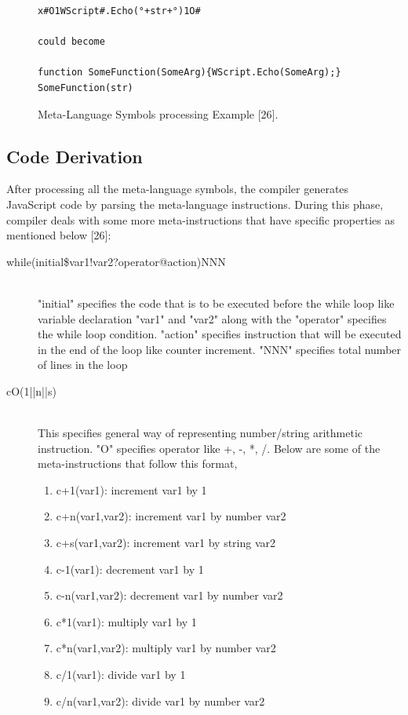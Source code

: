 \begin{figure}
  \centering
  \begin{lstlisting}[language=myasm,numbers=none]
x#O1WScript#.Echo(°+str+°)1O# 

could become

function SomeFunction(SomeArg){WScript.Echo(SomeArg);}
SomeFunction(str)
\end{lstlisting}
    \caption[Meta-Language Symbols processing Example]{Meta-Language Symbols processing Example [26].}
    \label{fig:metalanguageprocessing}
\end{figure}

\subsection{Code Derivation}
After processing all the meta-language symbols, the compiler generates JavaScript code by parsing the meta-language instructions. During this phase, compiler deals with some more meta-instructions that have specific properties as mentioned below [26]:

\begin{description}

\item[while(initial\$var1!var2?operator@action)NNN] \hfill \\
"initial" specifies the code that is to be executed before the while loop like variable declaration
"var1" and "var2" along with the "operator" specifies the while loop condition.
"action" specifies instruction that will be executed in the end of the loop like counter increment.
"NNN" specifies total number of lines in the loop
\item[cO(1||n||s)] \hfill \\
This specifies general way of representing number/string arithmetic instruction. "O" specifies operator like +, -, *, /. Below are some of the meta-instructions that follow this format,
\begin{enumerate}
\item c+1(var1): increment var1 by 1
\item c+n(var1,var2): increment var1 by number var2
\item c+s(var1,var2): increment var1 by string var2
\item c-1(var1): decrement var1 by 1
\item c-n(var1,var2): decrement var1 by number var2
\item c*1(var1): multiply var1 by 1
\item c*n(var1,var2): multiply var1 by number var2
\item c/1(var1): divide var1 by 1
\item c/n(var1,var2): divide var1 by number var2 
  \end{enumerate}
\end{description}

